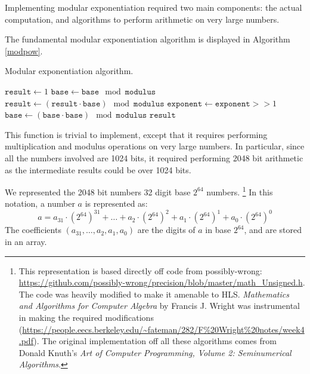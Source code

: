 Implementing modular exponentiation required two main components: the actual computation, and algorithms to perform
arithmetic on very large numbers.

The fundamental modular exponentiation algorithm is displayed in Algorithm \ref{modpow}.

\begin{algorithm}[!htb]
  \label{modpow}
  \caption[test]{Modular exponentiation algorithm.\footnotemark}
  \begin{algorithmic}
    \EndIf
    \State $\mathtt{result} \gets 1$
    \State $\mathtt{base} \gets \mathtt{base} \mod \mathtt{modulus}$
        \State $\mathtt{result} \gets (\mathtt{result} \cdot \mathtt{base}) \mod \mathtt{modulus}$
      \EndIf
      \State $\mathtt{exponent} \gets \mathtt{exponent} >> 1$
      \State $\mathtt{base} \gets (\mathtt{base} \cdot \mathtt{base}) \mod \mathtt{modulus}$
    \EndWhile
    \Return $\mathtt{result}$
    \EndProcedure
  \end{algorithmic}
\end{algorithm}
  

This function is trivial to implement, except that it requires performing multiplication and modulus operations on very large numbers.
In particular, since all the numbers involved are 1024 bits, it required performing 2048 bit arithmetic as the intermediate results
could be over 1024 bits.

We represented the 2048 bit numbers 32 digit base $2^{64}$ numbers. \footnote{This representation is based directly off code from possibly-wrong: \url{https://github.com/possibly-wrong/precision/blob/master/math_Unsigned.h}. The code was heavily modified to make it amenable to HLS. \emph{Mathematics and Algorithms for Computer Algebra} by Francis J. Wright was instrumental in making the required modifications (\url{https://people.eecs.berkeley.edu/~fateman/282/F\%20Wright\%20notes/week4.pdf}). The original implementation off all these algorithms comes from Donald Knuth's \emph{Art of Computer Programming, Volume 2: Seminumerical Algorithms}.}
In this notation, a number $a$ is represented as:
$$a = a_{31} \cdot \left ( 2^{64} \right )^{31} + \ldots + a_{2} \cdot \left ( 2^{64} \right )^{2} + a_{1} \cdot \left ( 2^{64} \right )^{1} + a_{0} \cdot \left ( 2^{64} \right )^{0}$$
The coefficients $\left( a_{31}, \ldots, a_2, a_1, a_0 \right )$ are the digits of $a$ in base $2^{64}$, and are stored in an array.

